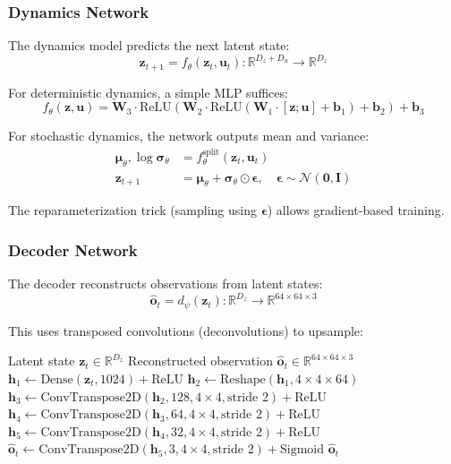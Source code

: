 \subsubsection{Dynamics Network}

The dynamics model predicts the next latent state:
\begin{equation}
\mathbf{z}_{t+1} = f_\theta(\mathbf{z}_t, \mathbf{u}_t): \mathbb{R}^{D_z + D_u} \to \mathbb{R}^{D_z}
\end{equation}

For deterministic dynamics, a simple MLP suffices:
\begin{equation}
f_\theta(\mathbf{z}, \mathbf{u}) = \mathbf{W}_3 \cdot \text{ReLU}(\mathbf{W}_2 \cdot \text{ReLU}(\mathbf{W}_1 \cdot [\mathbf{z}; \mathbf{u}] + \mathbf{b}_1) + \mathbf{b}_2) + \mathbf{b}_3
\end{equation}

For stochastic dynamics, the network outputs mean and variance:
\begin{align}
\boldsymbol{\mu}_\theta, \log \boldsymbol{\sigma}_\theta &= f_\theta^{\text{split}}(\mathbf{z}_t, \mathbf{u}_t) \\
\mathbf{z}_{t+1} &= \boldsymbol{\mu}_\theta + \boldsymbol{\sigma}_\theta \odot \boldsymbol{\epsilon}, \quad \boldsymbol{\epsilon} \sim \mathcal{N}(\mathbf{0}, \mathbf{I})
\end{align}

The reparameterization trick (sampling using $\boldsymbol{\epsilon}$) allows gradient-based training.

\subsubsection{Decoder Network}

The decoder reconstructs observations from latent states:
\begin{equation}
\hat{\mathbf{o}}_t = d_\psi(\mathbf{z}_t): \mathbb{R}^{D_z} \to \mathbb{R}^{64 \times 64 \times 3}
\end{equation}

This uses transposed convolutions (deconvolutions) to upsample:

\begin{algorithm}[H]
\caption{Transposed Convolutional Decoder Architecture}
\begin{algorithmic}[1]
\Require Latent state $\mathbf{z}_t \in \mathbb{R}^{D_z}$
\Ensure Reconstructed observation $\hat{\mathbf{o}}_t \in \mathbb{R}^{64 \times 64 \times 3}$
\State $\mathbf{h}_1 \gets \text{Dense}(\mathbf{z}_t, 1024) + \text{ReLU}$
\State $\mathbf{h}_2 \gets \text{Reshape}(\mathbf{h}_1, 4 \times 4 \times 64)$
\State $\mathbf{h}_3 \gets \text{ConvTranspose2D}(\mathbf{h}_2, 128, 4\times4, \text{stride } 2) + \text{ReLU}$
\State $\mathbf{h}_4 \gets \text{ConvTranspose2D}(\mathbf{h}_3, 64, 4\times4, \text{stride } 2) + \text{ReLU}$
\State $\mathbf{h}_5 \gets \text{ConvTranspose2D}(\mathbf{h}_4, 32, 4\times4, \text{stride } 2) + \text{ReLU}$
\State $\hat{\mathbf{o}}_t \gets \text{ConvTranspose2D}(\mathbf{h}_5, 3, 4\times4, \text{stride } 2) + \text{Sigmoid}$
\State \Return $\hat{\mathbf{o}}_t$
\end{algorithmic}
\end{algorithm}

